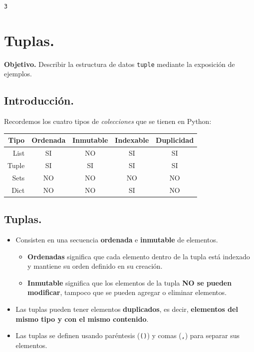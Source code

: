 \documentclass[
  spanish,
  letterpaper,
]{scrbook}
\providecommand{\tightlist}{%
  \setlength{\itemsep}{0pt}\setlength{\parskip}{0pt}}
\theoremstyle{definition}
\theoremstyle{remark}
\begin{document}
\begin{verbatim}
3
\end{verbatim}

\chapter{Tuplas.}\label{sec-j-tuplas}

\textbf{Objetivo.} Describir la estructura de datos \texttt{tuple}
mediante la exposición de ejemplos.

\section{Introducción.}\label{introducciuxf3n.-1}

Recordemos los cuatro tipos de \emph{colecciones} que se tienen en
Python:

\begin{longtable}[]{@{}rcccc@{}}
\toprule\noalign{}
Tipo & Ordenada & Inmutable & Indexable & Duplicidad \\
\midrule\noalign{}
\endhead
\bottomrule\noalign{}
\endlastfoot
List & SI & NO & SI & SI \\
Tuple & SI & SI & SI & SI \\
Sets & NO & NO & NO & NO \\
Dict & NO & NO & SI & NO \\
\end{longtable}

\section{Tuplas.}\label{tuplas.}

\begin{itemize}
\tightlist
\item
  Consisten en una secuencia \textbf{ordenada} e \textbf{inmutable} de
  elementos.

  \begin{itemize}
  \tightlist
  \item
    \textbf{Ordenadas} significa que cada elemento dentro de la tupla
    está indexado y mantiene su orden definido en su creación.
  \item
    \textbf{Inmutable} significa que los elementos de la tupla
    \textbf{NO se pueden modificar}, tampoco que se pueden agregar o
    eliminar elementos.
  \end{itemize}
\item
  Las tuplas pueden tener elementos \textbf{duplicados}, es decir,
  \textbf{elementos del mismo tipo y con el mismo contenido}.
\item
  Las tuplas se definen usando paréntesis (\texttt{()}) y comas
  (\texttt{,}) para separar sus elementos.
\end{itemize}
\end{document}

